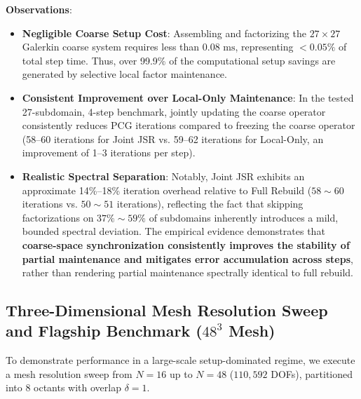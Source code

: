 \documentclass[preprint,12pt,3p]{elsarticle}
\begin{document}
\textbf{Observations}:
\begin{itemize}
    \item \textbf{Negligible Coarse Setup Cost}: Assembling and factorizing the $27 \times 27$ Galerkin coarse system requires less than $0.08\text{ ms}$, representing $< 0.05\%$ of total step time. Thus, over 99.9\% of the computational setup savings are generated by selective local factor maintenance.
    \item \textbf{Consistent Improvement over Local-Only Maintenance}: In the tested 27-subdomain, 4-step benchmark, jointly updating the coarse operator consistently reduces PCG iterations compared to freezing the coarse operator (58--60 iterations for Joint JSR vs. 59--62 iterations for Local-Only, an improvement of 1--3 iterations per step).
    \item \textbf{Realistic Spectral Separation}: Notably, Joint JSR exhibits an approximate 14\%--18\% iteration overhead relative to Full Rebuild ($58 \sim 60$ iterations vs. $50 \sim 51$ iterations), reflecting the fact that skipping factorizations on $37\% \sim 59\%$ of subdomains inherently introduces a mild, bounded spectral deviation. The empirical evidence demonstrates that \textbf{coarse-space synchronization consistently improves the stability of partial maintenance and mitigates error accumulation across steps}, rather than rendering partial maintenance spectrally identical to full rebuild.
\end{itemize}

\subsection{Three-Dimensional Mesh Resolution Sweep and Flagship Benchmark ($48^3$ Mesh)}
\label{subsec:res_flagship}
To demonstrate performance in a large-scale setup-dominated regime, we execute a mesh resolution sweep from $N=16$ up to $N=48$ ($110,592$ DOFs), partitioned into 8 octants with overlap $\delta = 1$.
\end{document}
